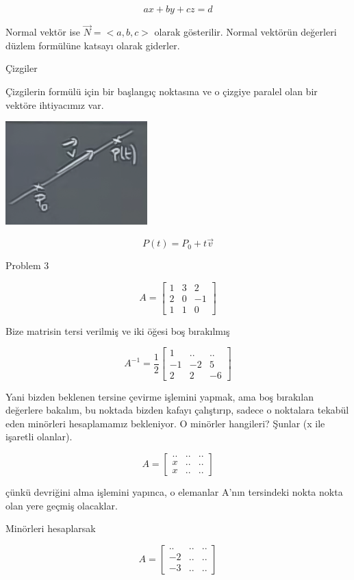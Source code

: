 \documentclass[12pt,fleqn]{article}\usepackage{../../common}
\begin{document}
$$ ax + by + cz  = d $$

Normal vektör ise $\vec{N} = <a,b,c>$ olarak gösterilir. Normal vektörün
değerleri düzlem formülüne katsayı olarak giderler. 

Çizgiler

Çizgilerin formülü için bir başlangıç noktasına ve o çizgiye paralel olan
bir vektöre ihtiyacımız var. 
\begin{center}
\includegraphics[height=4cm]{7_2.png}
\end{center}
$$ P(t) = P_0 + t \vec{v} $$

Problem 3

$$ A = 
\left[\begin{array}{rrr}
1 & 3 & 2 \\
2 & 0 & -1 \\
1 & 1 & 0
\end{array}\right]
 $$

Bize matrisin tersi verilmiş ve iki öğesi boş bırakılmış

$$ A^{-1} = \frac{1}{2}
\left[\begin{array}{rrr}
1 & .. & .. \\
-1 & -2 & 5 \\
2 & 2 & -6
\end{array}\right]
 $$

Yani bizden beklenen tersine çevirme işlemini yapmak, ama boş bırakılan
değerlere bakalım, bu noktada bizden kafayı çalıştırıp, sadece o noktalara 
tekabül 
eden minörleri hesaplamamız bekleniyor. O minörler hangileri? Şunlar (x ile
işaretli olanlar). 

$$ A = 
\left[\begin{array}{rrr}
.. & .. & ..\\
x & .. & ..\\
x & .. & ..
\end{array}\right]
 $$

çünkü devriğini alma işlemini yapınca, o elemanlar A'nın tersindeki nokta nokta 
olan
yere geçmiş olacaklar. 

Minörleri hesaplarsak

$$ A = 
\left[\begin{array}{rrr}
.. & .. & ..\\
-2 & .. & ..\\
-3 & .. & ..
\end{array}\right]
 $$
\end{document}
